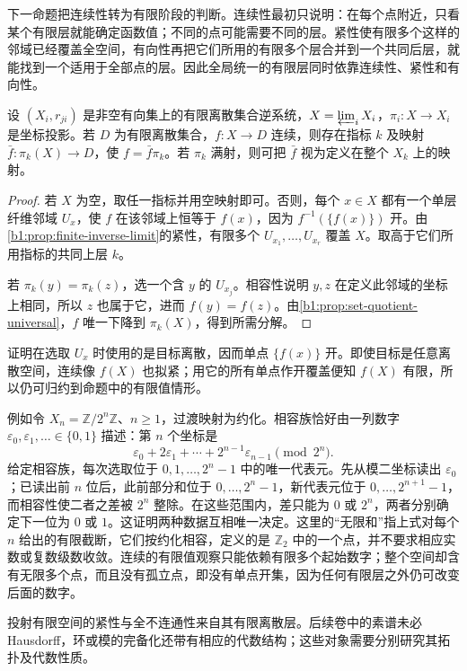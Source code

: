 \ProseParagraphBreak
下一命题把连续性转为有限阶段的判断。连续性最初只说明：在每个点附近，只看某个有限层就能确定函数值；不同的点可能需要不同的层。紧性使有限多个这样的邻域已经覆盖全空间，有向性再把它们所用的有限多个层合并到一个共同后层，就能找到一个适用于全部点的层。因此全局统一的有限层同时依靠连续性、紧性和有向性。

\begin{proposition}\label{b1:prop:finite-value-factorization}
	设 \((X_i,r_{ji})\) 是非空有向集上的有限离散集合逆系统，\(X=\varprojlim_iX_i\)，\(\pi_i:X\rightarrow X_i\) 是坐标投影。若 \(D\) 为有限离散集合，\(f:X\rightarrow D\) 连续，则存在指标 \(k\) 及映射 \(\bar f:\pi_k(X)\rightarrow D\)，使 \(f=\bar f\pi_k\)。若 \(\pi_k\) 满射，则可把 \(\bar f\) 视为定义在整个 \(X_k\) 上的映射。
\end{proposition}

\begin{proof}
	若 \(X\) 为空，取任一指标并用空映射即可。否则，每个 \(x\in X\) 都有一个单层纤维邻域 \(U_x\)，使 \(f\) 在该邻域上恒等于 \(f(x)\)，因为 \(f^{-1}(\{f(x)\})\) 开。由\cref{b1:prop:finite-inverse-limit}的紧性，有限多个 \(U_{x_1},\ldots,U_{x_r}\) 覆盖 \(X\)。取高于它们所用指标的共同上层 \(k\)。

	若 \(\pi_k(y)=\pi_k(z)\)，选一个含 \(y\) 的 \(U_{x_j}\)。相容性说明 \(y,z\) 在定义此邻域的坐标上相同，所以 \(z\) 也属于它，进而 \(f(y)=f(z)\)。由\cref{b1:prop:set-quotient-universal}，\(f\) 唯一下降到 \(\pi_k(X)\)，得到所需分解。
\end{proof}

证明在选取 \(U_x\) 时使用的是目标离散，因而单点 \(\{f(x)\}\) 开。即使目标是任意离散空间，连续像 \(f(X)\) 也拟紧；用它的所有单点作开覆盖便知 \(f(X)\) 有限，所以仍可归约到命题中的有限值情形。

\ProseParagraphBreak
例如令 \(X_n=\mathbb Z/2^n\mathbb Z\)、\(n\geq1\)，过渡映射为约化。相容族恰好由一列数字 \(\varepsilon_0,\varepsilon_1,\ldots\in\{0,1\}\) 描述：第 \(n\) 个坐标是
\[
	\varepsilon_0+2\varepsilon_1+\cdots+2^{n-1}\varepsilon_{n-1}\pmod{2^n}.
\]
给定相容族，每次选取位于 \(0,1,\ldots,2^n-1\) 中的唯一代表元。先从模二坐标读出 \(\varepsilon_0\)；已读出前 \(n\) 位后，此前部分和位于 \(0,\ldots,2^n-1\)，新代表元位于 \(0,\ldots,2^{n+1}-1\)，而相容性使二者之差被 \(2^n\) 整除。在这些范围内，差只能为 \(0\) 或 \(2^n\)，两者分别确定下一位为 \(0\) 或 \(1\)。这证明两种数据互相唯一决定。这里的“无限和”指上式对每个 \(n\) 给出的有限截断，它们按约化相容，定义的是 \(\mathbb Z_2\) 中的一个点，并不要求相应实数或复数级数收敛。连续的有限值观察只能依赖有限多个起始数字；整个空间却含有无限多个点，而且没有孤立点，即没有单点开集，因为任何有限层之外仍可改变后面的数字。

\ProseParagraphBreak
投射有限空间的紧性与全不连通性来自其有限离散层。后续卷中的素谱未必 Hausdorff，环或模的完备化还带有相应的代数结构；这些对象需要分别研究其拓扑及代数性质。
